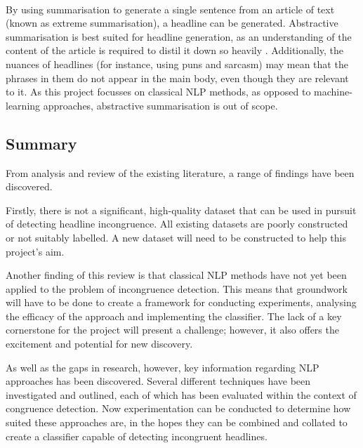\paragraph{}
By using summarisation to generate a single sentence from an article of text (known as extreme summarisation), a headline can be generated. Abstractive summarisation is best suited for headline generation, as an understanding of the content of the article is required to distil it down so heavily \cite{hayashi2018}. Additionally, the nuances of headlines (for instance, using puns and sarcasm) may mean that the phrases in them do not appear in the main body, even though they are relevant to it. As this project focusses on classical NLP methods, as opposed to machine-learning approaches, abstractive summarisation is out of scope.

\subsection{Summary}\label{lit:sum}

From analysis and review of the existing literature, a range of findings have been discovered.

Firstly, there is not a significant, high-quality dataset that can be used in pursuit of detecting headline incongruence. All existing datasets are poorly constructed or not suitably labelled. A new dataset will need to be constructed to help this project's aim.

Another finding of this review is that classical NLP methods have not yet been applied to the problem of incongruence detection. This means that groundwork will have to be done to create a framework for conducting experiments, analysing the efficacy of the approach and implementing the classifier. The lack of a key cornerstone for the project will present a challenge; however, it also offers the excitement and potential for new discovery.

As well as the gaps in research, however, key information regarding NLP approaches has been discovered. Several different techniques have been investigated and outlined, each of which has been evaluated within the context of congruence detection. Now experimentation can be conducted to determine how suited these approaches are, in the hopes they can be combined and collated to create a classifier capable of detecting incongruent headlines.
